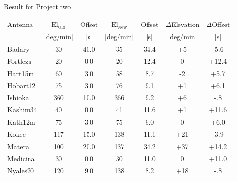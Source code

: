 \documentclass{beamer}
\begin{document}
    \begin{frame}{Result for Project two}
        \tabcolsep=0.15cm
        \begin{tabular}{l | c c | c c |c c}
            Antenna & $\text{El}_{\text{Old}}$ & Offset & $\text{El}_{\text{New}}$ & Offset & $\Delta$Elevation & $\Delta$Offset \\ [-8pt]
                    & \tiny{[deg/min]}& \tiny{[s]}&\tiny{[deg/min]}&\tiny{[s]}&\tiny{[deg/min]}& \tiny{[s]} \\ 
            \hline
            Badary            & 30  & 40.0  &  35 & 34.4 &  +5 & -5.6 \\
            Fortleza          & 20  &  0.0  &  20 & 12.4 &   0 &+12.4 \\
            Hart15m           &  60 &  3.0  &  58 &  8.7 &  -2 & +5.7 \\
            Hobart12          &  75 &  3.0  &  76 &  9.1 &  +1 & +6.1 \\
            Ishioka           & 360 & 10.0  & 366 &  9.2 &  +6 &  -.8 \\
            Kashim34          &  40 &  0.0  &  41 & 11.6 &  +1 &+11.6 \\
            Kath12m           &  75 &  3.0  &  75 &  9.0 &   0 & +6.0 \\
            Kokee             & 117 & 15.0  & 138 & 11.1 & +21 & -3.9 \\
            Matera            & 100 & 20.0  & 137 & 34.2 & +37 &+14.2 \\
            Medicina          &  30 &  0.0  & 30  & 11.0 &   0 &+11.0 \\
            Nyales20          & 120 &  9.0  & 138 &  8.2 & +18 & -.8 \\
        \end{tabular}
    \end{frame}
\end{document}
